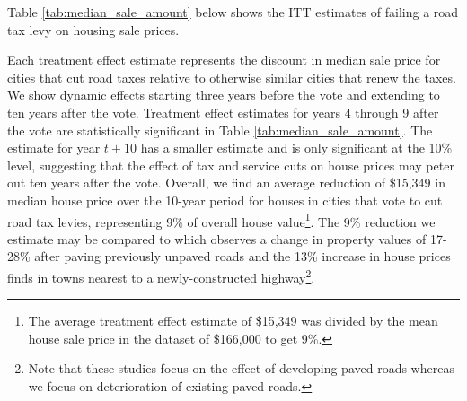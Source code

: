  Table \ref{tab:median_sale_amount} below shows the ITT estimates of failing a road tax levy on housing sale prices. 

\noindent  Each treatment effect estimate represents the discount in median sale price for cities that cut road taxes relative to otherwise similar cities that renew the taxes. We show dynamic effects starting three years before the vote and extending to ten years after the vote. Treatment effect estimates for years 4 through 9 after the vote are statistically significant in Table \ref{tab:median_sale_amount}. The estimate for year $t + 10$ has a smaller estimate and is only significant at the 10\% level, suggesting that the effect of tax and service cuts on house prices may peter out ten years after the vote. Overall, we find an average reduction of \$15,349 in median house price over the 10-year period for houses in cities that vote to cut road tax levies, representing 9\% of overall house value\footnote{The average treatment effect estimate of \$15,349 was divided by the mean house sale price in the dataset of \$166,000 to get 9\%.}. The 9\% reduction we estimate may be compared to \cite{gonzalez2016paving} which observes a change in property values of 17-28\% after paving previously unpaved roads and the 13\% increase in house prices \cite{theisen2021road} finds in towns nearest to a newly-constructed highway\footnote{Note that these studies focus on the effect of developing paved roads whereas we focus on deterioration of existing paved roads.}.

